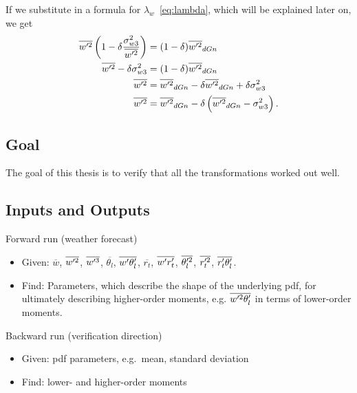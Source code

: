 \documentclass[10pt]{beamer}
\numberwithin{equation}{section}
\begin{document}
    \begin{frame}
        If we substitute in a formula for $\lambda_w$~\eqref{eq:lambda}, which will be explained later on, we get
        \begin{align}
            \overline{w'^2} \left(1 - \delta\frac{\sigma_{w 3}^2}{\overline{w'^2}}\right)
            &= (1 - \delta)\overline{w'^2}_{dGn} \nonumber\\
            \overline{w'^2} - \delta\sigma_{w 3}^2
            &= (1 - \delta)\overline{w'^2}_{dGn} \nonumber\\
            \overline{w'^2}
            &= \overline{w'^2}_{dGn} - \delta\overline{w'^2}_{dGn} + \delta\sigma_{w 3}^2 \nonumber\\
            \overline{w'^2}
            &= \overline{w'^2}_{dGn} - \delta\left(\overline{w'^2}_{dGn} - \sigma_{w 3}^2\right).
        \end{align}
    \end{frame}

    \subsection{Goal}\label{subsec:goal}

    \begin{frame}
        The goal of this thesis is to verify that all the transformations worked out well.
    \end{frame}

    \subsection{Inputs and Outputs}\label{subsec:inputs-and-outputs}

    \begin{frame}{Forward run (weather forecast)}
        \begin{itemize}
            [<+->]
            \item Given: $\overline{w}$, $\overline{w'^2}$, $\overline{w'^3}$, $\overline{\theta_l}$, $\overline{w' \theta_l'}$,
            $\overline{r_t}$, $\overline{w' r_t'}$, $\overline{\theta_l'^2}$, $\overline{r_t'^2}$, $\overline{r_t' \theta_l'}$.
            \item Find: Parameters, which describe the shape of the underlying pdf,
            for ultimately describing higher-order moments,
            e.g. $\overline{w'^2 \theta_l'}$ in terms of lower-order moments.
        \end{itemize}
    \end{frame}

    \begin{frame}{Backward run (verification direction)}
        \begin{itemize}
            [<+->]
            \item Given: pdf parameters, e.g.\ mean, standard deviation
            \item Find: lower- and higher-order moments
        \end{itemize}
    \end{frame}
\end{document}
